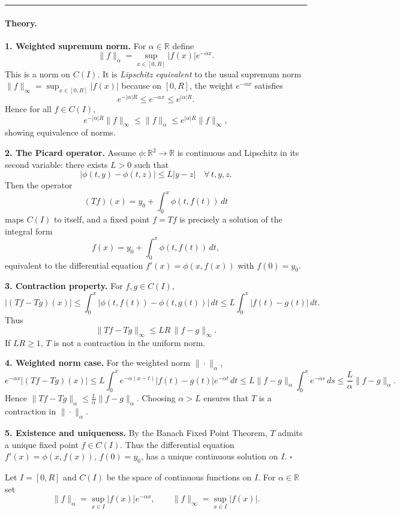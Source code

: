 \documentclass[12pt,a4paper]{article}
\newcommand{\qed}{\hfill$\square$}
\theoremstyle{plain}
\theoremstyle{definition}
\theoremstyle{remark}
\theoremstyle{remark}
\begin{document}
\bigskip
\hrule
\bigskip

\paragraph{Theory.}

\textbf{1. Weighted supremum norm.}
For $\alpha\in\mathbb{R}$ define
\[
\|f\|_\alpha=\sup_{x\in[0,R]}|f(x)|e^{-\alpha x}.
\]
This is a norm on $C(I)$. It is \emph{Lipschitz equivalent} to the usual supremum norm
\(\|f\|_\infty=\sup_{x\in[0,R]}|f(x)|\)
because on $[0,R]$, the weight $e^{-\alpha x}$ satisfies
\[
e^{-|\alpha|R}\le e^{-\alpha x}\le e^{|\alpha|R}.
\]
Hence for all $f\in C(I)$,
\[
e^{-|\alpha|R}\|f\|_\infty \le \|f\|_\alpha \le e^{|\alpha|R}\|f\|_\infty,
\]
showing equivalence of norms.

\bigskip

\textbf{2. The Picard operator.}
Assume $\phi:\mathbb{R}^2\to\mathbb{R}$ is continuous and Lipschitz in its second variable:
there exists $L>0$ such that
\[
|\phi(t,y)-\phi(t,z)|\le L|y-z| \quad \forall\, t,y,z.
\]
Then the operator
\[
(Tf)(x)=y_0+\int_0^x \phi(t,f(t))\,dt
\]
maps $C(I)$ to itself, and a fixed point $f=Tf$ is precisely a solution of the integral form
\[
f(x)=y_0+\int_0^x \phi(t,f(t))\,dt,
\]
equivalent to the differential equation $f'(x)=\phi(x,f(x))$ with $f(0)=y_0$.

\bigskip

\textbf{3. Contraction property.}
For $f,g\in C(I)$,
\[
|(Tf-Tg)(x)|\le \int_0^x |\phi(t,f(t))-\phi(t,g(t))|\,dt
\le L\int_0^x |f(t)-g(t)|\,dt.
\]
Thus
\[
\|Tf-Tg\|_\infty\le LR\,\|f-g\|_\infty.
\]
If $LR\ge1$, $T$ is not a contraction in the uniform norm.

\bigskip

\textbf{4. Weighted norm case.}
For the weighted norm $\|\cdot\|_\alpha$,
\[
e^{-\alpha x}|(Tf-Tg)(x)|
\le L\int_0^x e^{-\alpha(x-t)}|f(t)-g(t)|e^{-\alpha t}\,dt
\le L\|f-g\|_\alpha \int_0^x e^{-\alpha s}\,ds
\le \frac{L}{\alpha}\|f-g\|_\alpha.
\]
Hence $\|Tf-Tg\|_\alpha\le \frac{L}{\alpha}\|f-g\|_\alpha$.  
Choosing $\alpha>L$ ensures that $T$ is a contraction in $\|\cdot\|_\alpha$.

\bigskip

\textbf{5. Existence and uniqueness.}
By the Banach Fixed Point Theorem, $T$ admits a unique fixed point $f\in C(I)$.
Thus the differential equation $f'(x)=\phi(x,f(x))$, $f(0)=y_0$, has a unique continuous solution on $I$.
\qed

Let $I=[0,R]$ and $C(I)$ be the space of continuous functions on $I$. For $\alpha\in\mathbb R$ set
\[
\|f\|_\alpha=\sup_{x\in I}|f(x)|e^{-\alpha x},\qquad \|f\|_\infty=\sup_{x\in I}|f(x)|.
\]
\end{document}
